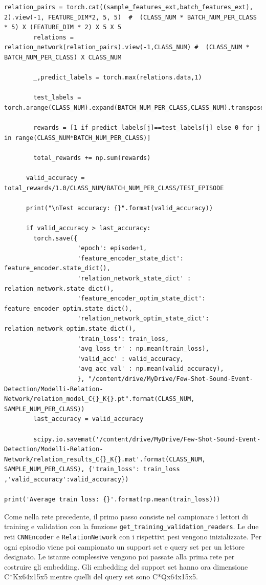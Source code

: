 \documentclass[12pt,a4paper,titlepage]{article}
\begin{document}
\begin{lstlisting}[language=iPython,firstnumber=1, caption=relation\_training.py, label=relation training,captionpos=b]
        relation_pairs = torch.cat((sample_features_ext,batch_features_ext), 2).view(-1, FEATURE_DIM*2, 5, 5)  #  (CLASS_NUM * BATCH_NUM_PER_CLASS * 5) X (FEATURE_DIM * 2) X 5 X 5
        relations = relation_network(relation_pairs).view(-1,CLASS_NUM) #  (CLASS_NUM * BATCH_NUM_PER_CLASS) X CLASS_NUM

        _,predict_labels = torch.max(relations.data,1)

        test_labels = torch.arange(CLASS_NUM).expand(BATCH_NUM_PER_CLASS,CLASS_NUM).transpose(1,0).reshape(-1)

        rewards = [1 if predict_labels[j]==test_labels[j] else 0 for j in range(CLASS_NUM*BATCH_NUM_PER_CLASS)]

        total_rewards += np.sum(rewards)

      valid_accuracy = total_rewards/1.0/CLASS_NUM/BATCH_NUM_PER_CLASS/TEST_EPISODE

      print("\nTest accuracy: {}".format(valid_accuracy))

      if valid_accuracy > last_accuracy:
        torch.save({
                    'epoch': episode+1,
                    'feature_encoder_state_dict': feature_encoder.state_dict(),
                    'relation_network_state_dict' : relation_network.state_dict(),
                    'feature_encoder_optim_state_dict': feature_encoder_optim.state_dict(),
                    'relation_network_optim_state_dict': relation_network_optim.state_dict(),
                    'train_loss': train_loss,
                    'avg_loss_tr' : np.mean(train_loss),
                    'valid_acc' : valid_accuracy,
                    'avg_acc_val' : np.mean(valid_accuracy),
                    }, "/content/drive/MyDrive/Few-Shot-Sound-Event-Detection/Modelli-Relation-Network/relation_model_C{}_K{}.pt".format(CLASS_NUM, SAMPLE_NUM_PER_CLASS))
        last_accuracy = valid_accuracy

        scipy.io.savemat('/content/drive/MyDrive/Few-Shot-Sound-Event-Detection/Modelli-Relation-Network/relation_results_C{}_K{}.mat'.format(CLASS_NUM, SAMPLE_NUM_PER_CLASS), {'train_loss': train_loss ,'valid_accuracy':valid_accuracy})

print('Average train loss: {}'.format(np.mean(train_loss)))
\end{lstlisting}

Come nella rete precedente, il primo passo consiste nel campionare i lettori di training e validation con la funzione \texttt{get\_training\_validation\_readers}.
Le due reti \texttt{CNNEncoder} e \texttt{RelationNetwork} con i rispettivi pesi vengono inizializzate.
Per ogni episodio viene poi campionato un support set e query set per un lettore designato.
Le istanze complessive vengono poi passate alla prima rete per costruire gli embedding.
Gli embedding del support set hanno ora dimensione C*Kx64x15x5 mentre quelli del query set sono C*Qx64x15x5.
\end{document}
